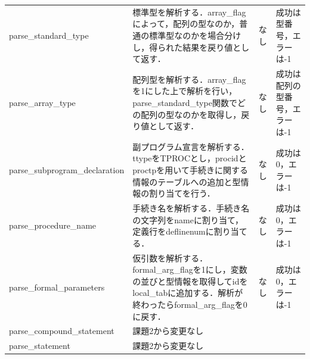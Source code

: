 \documentclass{jlreq}
\begin{document}
\begin{table}[H]
{\begin{tabular}{|l|p{15cm}|l|p{6cm}|}
      parse\_standard\_type           & 標準型を解析する．array\_flagによって，配列の型なのか，普通の標準型なのかを場合分けし，得られた結果を戻り値として返す．                                                                                                                                        & なし & 成功は型番号，エラーは-1           \\
      parse\_array\_type              & 配列型を解析する．array\_flagを1にした上で解析を行い，parse\_standard\_type関数でどの配列の型なのかを取得し，戻り値として返す．                                                                                                                                & なし & 成功は配列の型番号，エラーは-1     \\
      parse\_subprogram\_declaration  & 副プログラム宣言を解析する．ttypeをTPROCとし，procidとproctpを用いて手続きに関する情報のテーブルへの追加と型情報の割り当てを行う．                                                                                                                             & なし & 成功は0，エラーは-1                \\
      parse\_procedure\_name          & 手続き名を解析する．手続き名の文字列をnameに割り当て，定義行をdeflinenumに割り当てる．                                                                                                                                                                         & なし & 成功は0，エラーは-1                \\
      parse\_formal\_parameters       & 仮引数を解析する．formal\_arg\_flagを1にし，変数の並びと型情報を取得してidをlocal\_tabに追加する．解析が終わったらformal\_arg\_flagを0に戻す．                                                                                                                 & なし & 成功は0，エラーは-1                \\
      parse\_compound\_statement      & 課題2から変更なし                                                                                                                                                                                                                                              & ~    & ~                                  \\
      parse\_statement                & 課題2から変更なし                                                                                                                                                                                                                                              & ~    & ~                                  \\

\end{tabular}}
\end{table}
\end{document}
